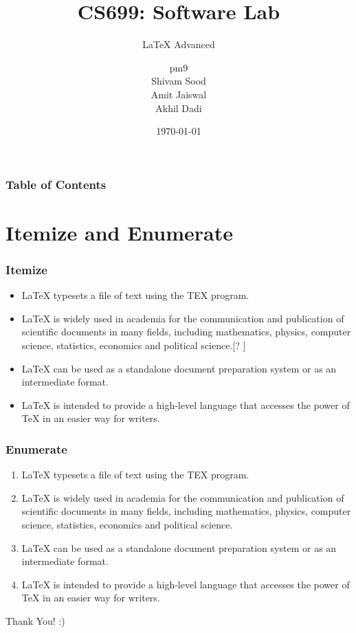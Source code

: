 \documentclass{beamer}
\title{CS699: Software Lab}
\subtitle{\LaTeX{} Advanced}
\author{pm9\\
Shivam Sood\\
Amit Jaiswal\\
Akhil Dadi}
\institute{Indian Institute of Technology, Bombay}
\date{\today}
\begin{document}

\begin{frame}
\titlepage
\end{frame}

\begin{frame}
\frametitle{Table of Contents}
\tableofcontents
\end{frame}


\section{Itemize and Enumerate}

\begin{frame}
\frametitle{Itemize}
\begin{itemize}
\item \LaTeX{} typesets a file of text using the TEX program.
\item \LaTeX{} is widely used in academia for the communication and publication of scientific documents in many fields, including mathematics, physics, computer science, statistics, economics and political science.[? ]
\item \LaTeX{} can be used as a standalone document preparation system or as an intermediate format.
\item \LaTeX{} is intended to provide a high-level language that accesses the power of TeX in an easier way for writers.
\end{itemize}
\end{frame}


\begin{frame}
\frametitle{Enumerate}
\begin{enumerate}
\item \LaTeX{} typesets a file of text using the TEX program.
\item \LaTeX{} is widely used in academia for the communication and publication of scientific documents in many fields, including mathematics, physics, computer science, statistics, economics and political science.
\item \LaTeX{} can be used as a standalone document preparation system or as an intermediate format.
\item \LaTeX{} is intended to provide a high-level language that accesses the power of TeX in an easier way for writers.
\end{enumerate}
\end{frame}

\begin{frame}
\centering \Huge
Thank You! :)
\end{frame}
\end{document}
